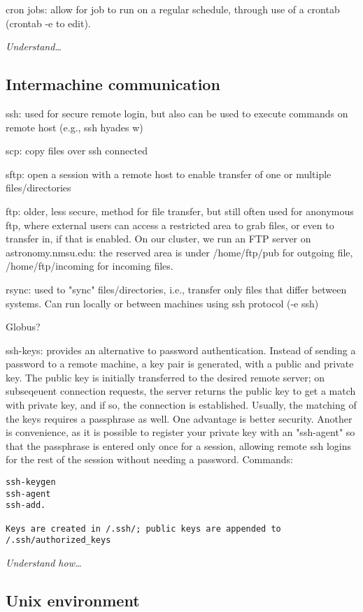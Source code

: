 \documentclass{article}
\newcommand{\test}[1]{%
    \begin{center}
        \colorbox{hl}{\parbox{0.9\textwidth}{\emph{#1}}}
    \end{center}}
\begin{document}
cron jobs: allow for job to run on a regular schedule, through use of
a crontab (crontab -e to edit).

\test{Understand\ldots}

\subsection{Intermachine communication}
ssh: used for secure remote login, but also can be used to execute
commands on remote host (e.g., ssh hyades w)

scp: copy files over ssh connected

sftp: open a session with a remote host to enable transfer of one or
multiple files/directories

ftp: older, less secure, method for file transfer, but still often
used for anonymous ftp, where external users can access a restricted
area to grab files, or even to transfer in, if that is enabled. On our
cluster, we run an FTP server on astronomy.nmsu.edu: the reserved area
is under /home/ftp/pub for outgoing file, /home/ftp/incoming for
incoming files.

rsync: used to "sync" files/directories, i.e., transfer only files
that differ between systems. Can run locally or between machines using
ssh protocol (-e ssh)

Globus?

ssh-keys: provides an alternative to password authentication. Instead
of sending a password to a remote machine, a key pair is generated,
with a public and private key. The public key is initially transferred
to the desired remote server; on subseqeuent connection requests, the
server returns the public key to get a match with private key, and if
so, the connection is established. Usually, the matching of the keys
requires a passphrase as well. One advantage is better security.
Another is convenience, as it is possible to register your private key
with an "ssh-agent" so that the passphrase is entered only once for a
session, allowing remote ssh logins for the rest of the session
without needing a password. Commands:
\begin{verbatim}
ssh-keygen
ssh-agent
ssh-add.

Keys are created in /.ssh/; public keys are appended to /.ssh/authorized_keys
\end{verbatim}

\test{Understand how\ldots}

\subsection{Unix environment}
\end{document}
